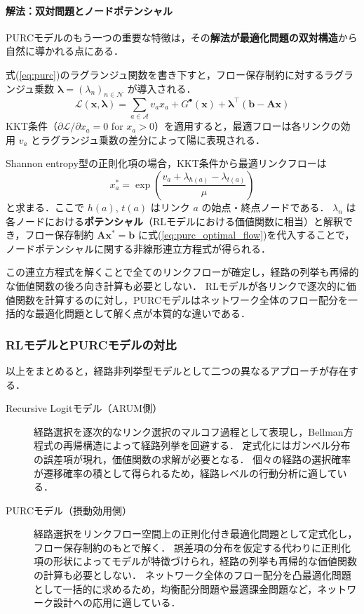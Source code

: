 \paragraph{解法：双対問題とノードポテンシャル}
PURCモデルのもう一つの重要な特徴は，その\textbf{解法が最適化問題の双対構造}から自然に導かれる点にある．

式(\ref{eq:purc})のラグランジュ関数を書き下すと，フロー保存制約に対するラグランジュ乗数 $\bm{\lambda} = (\lambda_n)_{n \in \mathcal{N}}$ が導入される．
\begin{equation}\label{eq:purc_lagrangian}
  \mathcal{L}(\bm{x}, \bm{\lambda}) = \sum_{a \in \mathcal{A}} v_a x_a + G^\bullet(\bm{x}) + \bm{\lambda}^\top (\bm{b} - \bm{A}\bm{x})
\end{equation}
KKT条件（$\partial \mathcal{L} / \partial x_a = 0$ for $x_a > 0$）を適用すると，最適フローは各リンクの効用 $v_a$ とラグランジュ乗数の差分によって陽に表現される．

Shannon entropy型の正則化項の場合，KKT条件から最適リンクフローは
\begin{equation}\label{eq:purc_optimal_flow}
  x_a^* = \exp\!\left(\frac{v_a + \lambda_{h(a)} - \lambda_{t(a)}}{\mu}\right)
\end{equation}
と求まる．ここで $h(a)$, $t(a)$ はリンク $a$ の始点・終点ノードである．
$\lambda_n$ は各ノードにおける\textbf{ポテンシャル}（RLモデルにおける価値関数に相当）と解釈でき，フロー保存制約 $\bm{A}\bm{x}^* = \bm{b}$ に式(\ref{eq:purc_optimal_flow})を代入することで，ノードポテンシャルに関する非線形連立方程式が得られる．

この連立方程式を解くことで全てのリンクフローが確定し，経路の列挙も再帰的な価値関数の後ろ向き計算も必要としない．
RLモデルが各リンクで逐次的に価値関数を計算するのに対し，PURCモデルはネットワーク全体のフロー配分を一括的な最適化問題として解く点が本質的な違いである．

\subsubsection{RLモデルとPURCモデルの対比}
以上をまとめると，経路非列挙型モデルとして二つの異なるアプローチが存在する．

\begin{description}
  \item[Recursive Logitモデル（ARUM側）]
    経路選択を逐次的なリンク選択のマルコフ過程として表現し，Bellman方程式の再帰構造によって経路列挙を回避する．
    定式化にはガンベル分布の誤差項が現れ，価値関数の求解が必要となる．
    個々の経路の選択確率が遷移確率の積として得られるため，経路レベルの行動分析に適している．

  \item[PURCモデル（摂動効用側）]
    経路選択をリンクフロー空間上の正則化付き最適化問題として定式化し，フロー保存制約のもとで解く．
    誤差項の分布を仮定する代わりに正則化項の形状によってモデルが特徴づけられ，経路の列挙も再帰的な価値関数の計算も必要としない．
    ネットワーク全体のフロー配分を凸最適化問題として一括的に求めるため，均衡配分問題や最適課金問題など，ネットワーク設計への応用に適している．
\end{description}

